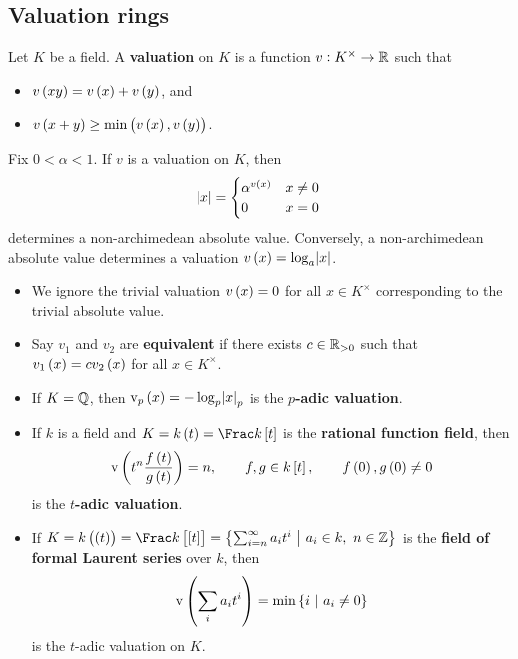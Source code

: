 \subsection{Valuation rings}

\begin{definition}
Let $ K $ be a field. A \textbf{valuation} on $ K $ is a function $ v : K^\times \to \mathbb{R} $ such that
\begin{itemize}
\item $ v\br{xy} = v\br{x} + v\br{y} $, and
\item $ v\br{x + y} \ge \min\br{v\br{x}, v\br{y}} $.
\end{itemize}
\end{definition}

Fix $ 0 < \alpha < 1 $. If $ v $ is a valuation on $ K $, then
$$ \abs{x} =
\begin{cases}
\alpha^{v\br{x}} & x \ne 0 \\
0 & x = 0
\end{cases}
$$
determines a non-archimedean absolute value. Conversely, a non-archimedean absolute value determines a valuation $ v\br{x} = \log_a \abs{x} $.

\begin{remark*}
\hfill
\begin{itemize}
\item We ignore the trivial valuation $ v\br{x} = 0 $ for all $ x \in K^\times $ corresponding to the trivial absolute value.
\item Say $ v_1 $ and $ v_2 $ are \textbf{equivalent} if there exists $ c \in \mathbb{R}_{> 0} $ such that $ v_1\br{x} = cv_2\br{x} $ for all $ x \in K^\times $.
\end{itemize}
\end{remark*}

\pagebreak

\begin{example*}
\hfill
\begin{itemize}
\item If $ K = \mathbb{Q} $, then $ \v_p\br{x} = -\log_p \abs{x}_p $ is the \textbf{$ p $-adic valuation}.
\item If $ k $ is a field and $ K = k\br{t} = \Frac k\sbr{t} $ is the \textbf{rational function field}, then
$$ \v\br{t^n\dfrac{f\br{t}}{g\br{t}}} = n, \qquad f, g \in k\sbr{t}, \qquad f\br{0}, g\br{0} \ne 0 $$
is the \textbf{$ t $-adic valuation}.
\item If $ K = k\br{\br{t}} = \Frac k\sbr{\sbr{t}} = \cbr{\sum_{i = n}^\infty a_it^i \st a_i \in k, \ n \in \ZZ} $ is the \textbf{field of formal Laurent series} over $ k $, then
$$ \v\br{\sum_i a_it^i} = \min \cbr{i \st a_i \ne 0} $$
is the $ t $-adic valuation on $ K $.
\end{itemize}
\end{example*}

